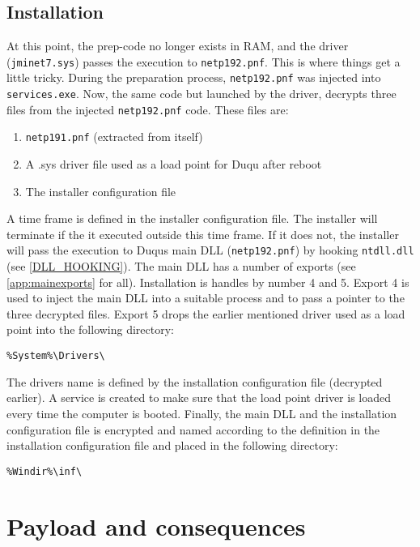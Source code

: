\documentclass[11pt,english,a4paper]{report}
\begin{document}
\section{Installation}
At this point, the prep-code no longer exists in RAM, and the driver (\texttt{jminet7.sys}) passes the execution to \texttt{netp192.pnf}. This is where things get a little tricky. During the preparation process, \texttt{netp192.pnf} was injected into \texttt{services.exe}. Now, the same code but launched by the driver, decrypts three files from the injected \texttt{netp192.pnf} code. These files are:
 \begin{enumerate}
   \item \texttt{netp191.pnf} (extracted from itself)
   \item A .sys driver file used as a load point for Duqu after reboot
   \item The installer configuration file
  \end{enumerate}
A time frame is defined in the installer configuration file. The installer will terminate if the it executed outside this time frame. If it does not, the installer will pass the execution to Duqus main DLL (\texttt{netp192.pnf}) by hooking \texttt{ntdll.dll} (see \ref{DLL_HOOKING}). The main DLL has a number of exports (see \ref{app:mainexports} for all). Installation is handles by number 4 and 5. Export 4 is used to inject the main DLL into a suitable process and to pass a pointer to the three decrypted files. Export 5 drops the earlier mentioned driver used as a load point into the following directory:
\begin{lstlisting}
%System%\Drivers\ 
\end{lstlisting}
The drivers name is defined by the installation configuration file (decrypted earlier). A service is created to make sure that the load point driver is loaded every time the computer is booted. Finally, the main DLL and the installation configuration file is encrypted and named according to the definition in the installation configuration file and placed in the following directory:
\begin{lstlisting}
%Windir%\inf\ 
\end{lstlisting}

\chapter{Payload and consequences}
\end{document}
